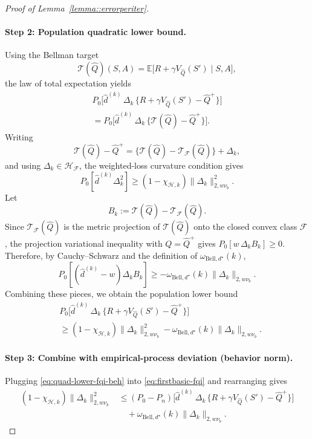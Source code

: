 \documentclass{article}
\theoremstyle{plain}
\theoremstyle{definition}
\theoremstyle{remark}
\newcommand{\E}{\mathbb{E}}
\begin{document}
\begin{proof}[Proof of Lemma~\ref{lemma::errorperiter}]
\paragraph{Step 2: Population quadratic lower bound.}
Using the Bellman target
\[
\mathcal T(\widehat Q)(S,A)
=
\E\bigl[
  R + \gamma V_{\widehat Q}(S') \mid S,A
\bigr],
\]
the law of total expectation yields
\begin{align*}
P_0\big[
  \widehat d^{(k)}\,
  \Delta_k\,
  \{R + \gamma V_{\widehat Q}(S') - \widehat Q^+\}
\big]
\\
=
P_0\big[
  \widehat d^{(k)}\,
  \Delta_k\,
  \{\mathcal T(\widehat Q) - \widehat Q^+\}
\big].
\end{align*}
Writing
\[
\mathcal T(\widehat Q) - \widehat Q^+
=
\{\mathcal T(\widehat Q) - \mathcal T_{\mathcal F}(\widehat Q)\}
+
\Delta_k,
\]
and using \(\Delta_k\in\mathcal H_{\mathcal F}\), the weighted-loss curvature
condition gives
\[
P_0[\widehat d^{(k)}\Delta_k^2]
\ge
(1-\chi_{\mathcal H,k})\|\Delta_k\|_{2,w\nu_b}^2.
\]
Let
\[
B_k
:=
\mathcal T(\widehat Q)-\mathcal T_{\mathcal F}(\widehat Q).
\]
Since \(\mathcal T_{\mathcal F}(\widehat Q)\) is the metric projection of
\(\mathcal T(\widehat Q)\) onto the closed convex class \(\mathcal F\), the
projection variational inequality with \(Q=\widehat Q^+\) gives
\(P_0[w\,\Delta_k B_k]\ge0\). Therefore, by Cauchy--Schwarz and the definition
of \(\omega_{\mathrm{Bell},d^\star}(k)\),
\[
P_0[(\widehat d^{(k)}-w)\Delta_k B_k]
\ge
-\omega_{\mathrm{Bell},d^\star}(k)\|\Delta_k\|_{2,w\nu_b}.
\]
Combining these pieces, we obtain the population lower bound
\begin{align}
\label{eq:quad-lower-fqi-beh}
&P_0\big[
  \widehat d^{(k)}\,
  \Delta_k\,
  \{R + \gamma V_{\widehat Q}(S') - \widehat Q^+\}
\big]
\\
&\ge
(1-\chi_{\mathcal H,k})\|\Delta_k\|_{2,w\nu_b}^2
-
\omega_{\mathrm{Bell},d^\star}(k)\|\Delta_k\|_{2,w\nu_b}.
\nonumber
\end{align}

\paragraph{Step 3: Combine with empirical-process deviation (behavior norm).}
Plugging \eqref{eq:quad-lower-fqi-beh} into \eqref{eq:firstbasic-fqi} and
rearranging gives
\begin{align}
\label{eq:basic-ineq-fqi-beh}
(1-\chi_{\mathcal H,k})\|\Delta_k\|_{2,w\nu_b}^2
&\le
(P_0 - P_n)\big[
  \widehat d^{(k)}\,
  \Delta_k\,
  \{R + \gamma V_{\widehat Q}(S') - \widehat Q^+\}
\big]
\\[-0.25em]
&\quad+
\omega_{\mathrm{Bell},d^\star}(k)\|\Delta_k\|_{2,w\nu_b}.
\nonumber
\end{align}


\end{proof}
\end{document}
